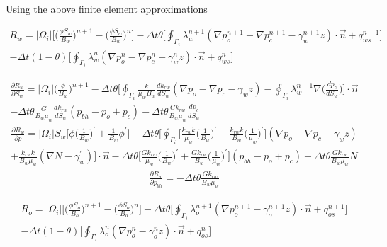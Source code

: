 \documentclass[12pt]{article}
\begin{document}
Using the above finite element approximations

\begin{multline}	\label{w2a}
R_w = |\Omega_i|\Big[\Big(\frac{\phi S_w}{B_w}\Big)^{n+1}-\Big(\frac{\phi S_w}{B_w}\Big)^n\Big] - \Delta t\theta\Big[\oint_{\Gamma_i}\lambda^{n+1}_w(\nabla p^{n+1}_o-\nabla p^{n+1}_c-\gamma^{n+1}_wz)\cdot\vec{n}+ q^{n+1}_{ws}\Big]  \\
- \Delta t(1-\theta)\Big[\oint_{\Gamma_i}\lambda^{n}_w(\nabla p^{n}_o-\nabla p^n_c-\gamma^n_wz)\cdot\vec{n}+q^{n}_{ws}\Big]
\end{multline}

\begin{multline}
\frac{\partial R_w}{\partial S_w} = |\Omega_i|\Big(\frac{\phi }{B_w}\Big)^{n+1}- \Delta t\theta\Big[\oint_{\Gamma_i}\frac{k}{\mu_wB_w}\frac{d k_{rw}}{d S_w}(\nabla p_o-\nabla p_c-\gamma_wz) -\oint_{\Gamma_i}\lambda^{n+1}_w\nabla \big(\frac{d p_c}{d S_w}\big)\Big]  \cdot\vec{n}	\\
- \Delta t\theta\frac{G}{B_w\mu_w}\frac{dk_{rw}}{dS_w}(p_{bh}-p_o+p_c)- \Delta t\theta\frac{Gk_{rw}}{B_w\mu_w}\frac{dp_c}{dS_w}
\end{multline}
%
\begin{multline}
\frac{\partial R_w}{\partial p} = |\Omega_i|S_w\Big[\phi \big(\frac{1}{B_w}\big)^\prime +\frac{1}{B_w}\phi^\prime\Big] - \Delta t\theta\Bigg[\oint_{\Gamma_i}\Big[\frac{k_{rw}k}{\mu_w}\big(\frac{1}{B_w}\big)^\prime+\frac{k_{rw}k}{B_w}\big(\frac{1}{\mu_w}\big)^\prime\Big](\nabla p_o -\nabla p_c-\gamma_w z) \\
+\frac{k_{rw}k}{B_w\mu_w}(\nabla N-\gamma_w^\prime) \Bigg]\cdot\vec{n} - \Delta t\theta\Big[\frac{Gk_{rw}}{\mu_w}\big(\frac{1}{B_w}\big)^\prime + \frac{Gk_{rw}}{B_w}\big(\frac{1}{\mu_w}\big)^\prime\Big](p_{bh}-p_o+p_c)+ \Delta t\theta\frac{Gk_{rw}}{B_w\mu_w}N
\end{multline}
%
\begin{multline}
\frac{\partial R_w}{\partial p_{bh}} = -\Delta t\theta\frac{Gk_{rw}}{B_w\mu_w}
\end{multline}


\begin{multline}	%
R_o = |\Omega_i|\Big[\Big(\frac{\phi S_o}{B_o}\Big)^{n+1}-\Big(\frac{\phi S_o}{B_o}\Big)^n\Big] - \Delta t\theta\Big[\oint_{\Gamma_i}\lambda^{n+1}_o(\nabla p^{n+1}_o-\gamma^{n+1}_oz)\cdot\vec{n}+ q^{n+1}_{os}\Big]  \\
- \Delta t(1-\theta)\Big[\oint_{\Gamma_i}\lambda^{n}_o(\nabla p^{n}_o-\gamma^n_oz)\cdot\vec{n}+q^{n}_{os}\Big]
\end{multline}
\end{document}

